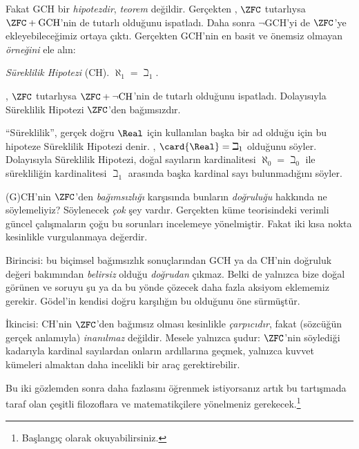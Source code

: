 \documentclass[../../../include/open-logic-section]{subfiles}
\begin{document}
Fakat GCH bir \emph{hipotezdir}, \emph{teorem} değildir. Gerçekten
\citet{Godel1938}, $\ZFC$ tutarlıysa $\ZFC+\text{GCH}$'nin de tutarlı
olduğunu ispatladı. Daha sonra $\lnot$GCH'yi de $\ZFC$'ye ekleyebileceğimiz
ortaya çıktı. Gerçekten GCH'nin en basit ve önemsiz olmayan \emph{örneğini}
ele alın:

\begin{defish}
\emph{Süreklilik Hipotezi} (CH). $\aleph_1=\beth_1$.
\end{defish}

\citet{Cohen1963}, $\ZFC$ tutarlıysa $\ZFC+\lnot\text{CH}$'nin de
tutarlı olduğunu ispatladı. Dolayısıyla Süreklilik Hipotezi $\ZFC$'den
bağımsızdır.

``Süreklilik'', gerçek doğru $\Real$ için kullanılan başka bir ad olduğu
için bu hipoteze Süreklilik Hipotezi denir.
, $\card{\Real}=\beth_1$ olduğunu söyler.
Dolayısıyla Süreklilik Hipotezi, doğal sayıların kardinalitesi
$\aleph_0=\beth_0$ ile sürekliliğin kardinalitesi $\beth_1$ arasında
başka kardinal sayı bulunmadığını söyler.

(G)CH'nin $\ZFC$'den \emph{bağımsızlığı} karşısında bunların
\emph{doğruluğu} hakkında ne söylemeliyiz? Söylenecek \emph{çok} şey
vardır. Gerçekten küme teorisindeki verimli güncel çalışmaların çoğu bu
sorunları incelemeye yönelmiştir. Fakat iki kısa nokta kesinlikle
vurgulanmaya değerdir.

Birincisi: bu biçimsel bağımsızlık sonuçlarından GCH ya da CH'nin doğruluk
değeri bakımından \emph{belirsiz} olduğu \emph{doğrudan} çıkmaz. Belki de
yalnızca bize doğal görünen ve soruyu şu ya da bu yönde çözecek daha fazla
aksiyom eklememiz gerekir. Gödel'in kendisi doğru karşılığın bu olduğunu
öne sürmüştür.

İkincisi: CH'nin $\ZFC$'den bağımsız olması kesinlikle \emph{çarpıcıdır},
fakat (sözcüğün gerçek anlamıyla) \emph{inanılmaz} değildir. Mesele
yalnızca şudur: $\ZFC$'nin söylediği kadarıyla kardinal sayılardan onların
ardıllarına geçmek, yalnızca kuvvet kümeleri almaktan daha incelikli bir
araç gerektirebilir.

Bu iki gözlemden sonra daha fazlasını öğrenmek istiyorsanız artık bu
tartışmada taraf olan çeşitli filozoflara ve matematikçilere yönelmeniz
gerekecek.\footnote{Başlangıç olarak
\citet[\S15.6]{Potter2004} okuyabilirsiniz.}
\end{document}
